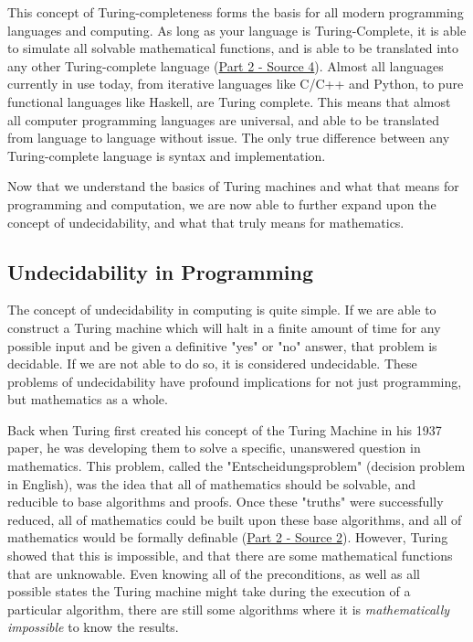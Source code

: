 \documentclass{article}
\begin{document}
    \medskip\noindent This concept of Turing-completeness forms the basis for all modern programming languages and computing. As long as your language is Turing-Complete, it is able to simulate all solvable mathematical functions, and is able to be translated into any other Turing-complete language (\href {https://chortle.ccsu.edu/StructuredC/Chap01/struct01_5.html}{Part 2 - Source 4}). Almost all languages currently in use today, from iterative languages like C/C++ and Python, to pure functional languages like Haskell, are Turing complete. This means that almost all computer programming languages are universal, and able to be translated from language to language without issue. The only true difference between any Turing-complete language is syntax and implementation. 
    
    \medskip\noindent Now that we understand the basics of Turing machines and what that means for programming and computation, we are now able to further expand upon the concept of undecidability, and what that truly means for mathematics. 

    \subsection{Undecidability in Programming}
    
    \medskip\noindent The concept of undecidability in computing is quite simple. If we are able to construct a Turing machine which will halt in a finite amount of time for any possible input and be given a definitive "yes" or "no" answer, that problem is decidable. If we are not able to do so, it is considered undecidable. These problems of undecidability have profound implications for not just programming, but mathematics as a whole. 
    
    \medskip\noindent Back when Turing first created his concept of the Turing Machine in his 1937 paper, he was developing them to solve a specific, unanswered question in mathematics. This problem, called the "Entscheidungsproblem" (decision problem in English), was the idea that all of mathematics should be solvable, and reducible to base algorithms and proofs. Once these "truths" were successfully reduced, all of mathematics could be built upon these base algorithms, and all of mathematics would be formally definable (\href {https://plato.stanford.edu/entries/turing-machine/}{Part 2 - Source 2}). However, Turing showed that this is impossible, and that there are some mathematical functions that are unknowable. Even knowing all of the preconditions, as well as all possible states the Turing machine might take during the execution of a particular algorithm, there are still some algorithms where it is \textit{mathematically impossible} to know the results. 
    
\end{document}
